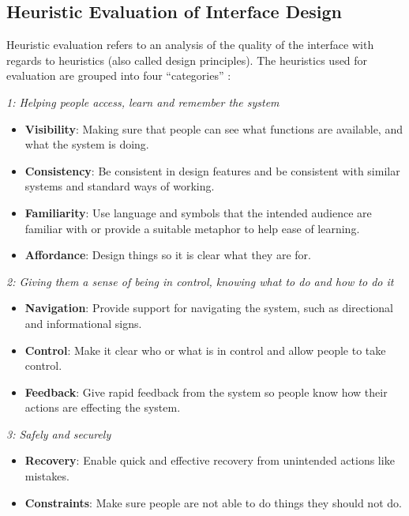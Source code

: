 \subsection{Heuristic Evaluation of Interface Design}
Heuristic evaluation refers to an analysis of the quality of the interface with regards to heuristics (also called design principles). The heuristics used for evaluation are grouped into four ``categories'' :

\textit{1: Helping people access, learn and remember the system}

\begin{itemize}
	\item{\textbf{Visibility}}: Making sure that people can see what functions are available, and what the system is doing.
	\item{\textbf{Consistency}}: Be consistent in design features and be consistent with similar systems and standard ways of working.
	\item{\textbf{Familiarity}}: Use language and symbols that the intended audience are familiar with or provide a suitable metaphor to help ease of learning.
	\item{\textbf{Affordance}}: Design things so it is clear what they are for.
\end{itemize}

\textit{2: Giving them a sense of being in control, knowing what to do and how to do it}

\begin{itemize}
	\item{\textbf{Navigation}}: Provide support for navigating the system, such as directional and informational signs.
	\item{\textbf{Control}}: Make it clear who or what is in control and allow people to take control.
	\item{\textbf{Feedback}}: Give rapid feedback from the system so people know how their actions are effecting the system.
\end{itemize}

	\textit{3: Safely and securely}
	
\begin{itemize}
	\item{\textbf{Recovery}}: Enable quick and effective recovery from unintended actions like mistakes.
	\item{\textbf{Constraints}}: Make sure people are not able to do things they should not do.
\end{itemize}
	
